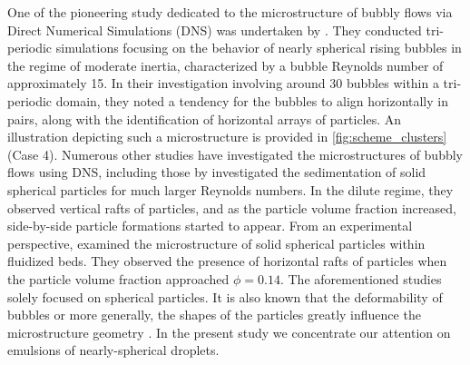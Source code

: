 

One of the pioneering study dedicated to the microstructure of bubbly flows via Direct Numerical Simulations (DNS) was undertaken by \citet{bunner2002dynamics}. 
They conducted tri-periodic simulations focusing on the behavior of nearly spherical rising bubbles in the regime of moderate inertia, characterized by a bubble Reynolds number of approximately 15. 
In their investigation involving around 30 bubbles within a tri-periodic domain, they noted a tendency for the bubbles to align horizontally in pairs, along with the identification of horizontal arrays of particles. 
An illustration depicting such a microstructure is provided in \ref{fig:scheme_clusters} (Case 4). 
Numerous other studies have investigated the microstructures of bubbly flows using DNS, including those by \citet{yin2008lattice,roghair2011drag,zhang2023evolution, shajahan2023inertial} investigated the sedimentation of solid spherical particles for much larger Reynolds numbers.
In the dilute regime, they observed vertical rafts of particles, and as the particle volume fraction increased, side-by-side particle formations started to appear. 
From an experimental perspective, \citet{almeras2021statistics} examined the microstructure of solid spherical particles within fluidized beds.
They observed the presence of horizontal rafts of particles when the particle volume fraction approached $\phi = 0.14$.
The aforementioned studies solely focused on spherical particles.
It is also known that the deformability of bubbles or more generally, the shapes of the particles greatly influence the microstructure geometry \citet{bunner2003effect,seyed2021sedimentation}. 
In the present study we concentrate our attention on emulsions of nearly-spherical droplets. 

